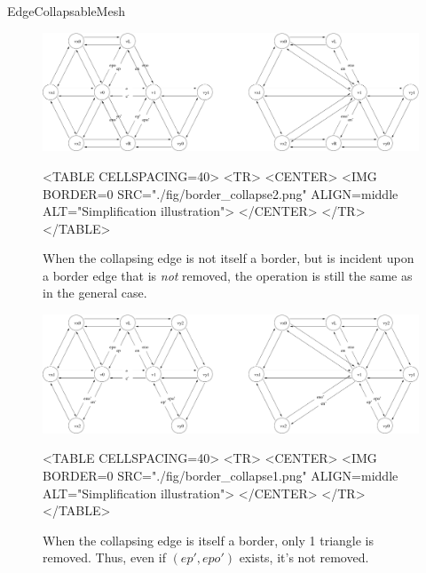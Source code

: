 \begin{ccRefConcept}{EdgeCollapsableMesh}
\begin{figure}[htbp]
\begin{ccTexOnly}
\begin{center}
\includegraphics[width=17cm]{Surface_mesh_simplification_ref/fig/border_collapse2} %
\end{center}
\end{ccTexOnly}
\begin{ccHtmlOnly}
<TABLE CELLSPACING=40>
<TR>
<CENTER>
<IMG BORDER=0 SRC="./fig/border_collapse2.png" ALIGN=middle ALT="Simplification illustration">
</CENTER>
</TR>
</TABLE>
\end{ccHtmlOnly}
\caption{When the collapsing edge is not itself a border, but is incident upon a border edge that is {\em not} removed, the operation is still the same as in the general case.}
\end{figure}

\begin{figure}[htbp]
\begin{ccTexOnly}
\begin{center}
\includegraphics[width=17cm]{Surface_mesh_simplification_ref/fig/border_collapse1} %
\end{center}
\end{ccTexOnly}
\begin{ccHtmlOnly}
<TABLE CELLSPACING=40>
<TR>
<CENTER>
<IMG BORDER=0 SRC="./fig/border_collapse1.png" ALIGN=middle ALT="Simplification illustration">
</CENTER>
</TR>
</TABLE>
\end{ccHtmlOnly}
\caption{When the collapsing edge is itself a border, only 1 triangle is removed. Thus, even if $(ep',epo')$ exists, it's not removed.}
\end{figure}


\end{ccRefConcept}
